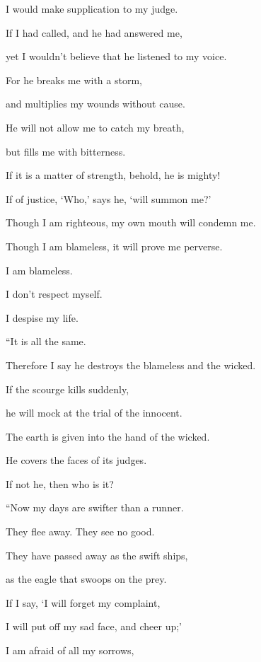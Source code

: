 {\par }{\QB I would make supplication to my judge.
\par }{\Q {}If I had called, and he had answered me,
\par }{\QB yet I wouldn’t believe that he listened to my voice.
\par }{\Q {}For he breaks me with a storm,
\par }{\QB and multiplies my wounds without cause.
\par }{\Q {}He will not allow me to catch my breath,
\par }{\QB but fills me with bitterness.
\par }{\Q {}If it is a matter of strength, behold, he is mighty!
\par }{\QB If of justice, ‘Who,’ says he, ‘will summon me?’
\par }{\Q {}Though I am righteous, my own mouth will condemn me.
\par }{\QB Though I am blameless, it will prove me perverse.
\par }{\Q {}I am blameless.
\par }{\QB I don’t respect myself.
\par }{\QB I despise my life.
\par }{\BB \par }{\Q {}“It is all the same.
\par }{\QB Therefore I say he destroys the blameless and the wicked.
\par }{\Q {}If the scourge kills suddenly,
\par }{\QB he will mock at the trial of the innocent.
\par }{\Q {}The earth is given into the hand of the wicked.
\par }{\QB He covers the faces of its judges.
\par }{\QB If not he, then who is it?
\par }{\BB \par }{\Q {}“Now my days are swifter than a runner.
\par }{\QB They flee away. They see no good.
\par }{\Q {}They have passed away as the swift ships,
\par }{\QB as the eagle that swoops on the prey.
\par }{\Q {}If I say, ‘I will forget my complaint,
\par }{\QB I will put off my sad face, and cheer up;’
\par }{\Q {}I am afraid of all my sorrows,
}
